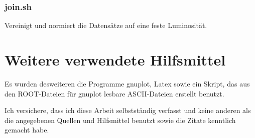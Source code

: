 \documentclass[a4paper,twoside]{scrartcl}
\begin{document}
\begin{appendix}
    \subsubsection{join.sh}
    \label{src:join.sh}
    Vereinigt und normiert die Datensätze auf eine feste Luminosität.
    \ifsources
      
      
    \fi
  \section*{Weitere verwendete Hilfsmittel}
  Es wurden desweiteren die Programme gnuplot, Latex sowie ein Skript, das aus
  den ROOT-Dateien für gnuplot lesbare ASCII-Dateien erstellt benutzt.
\end{appendix}

\newpage
\huge{Ich versichere, dass ich diese Arbeit selbstständig verfasst und keine
anderen als die angegebenen Quellen und Hilfsmittel benutzt sowie die Zitate
kenntlich gemacht habe.}
\end{document}
